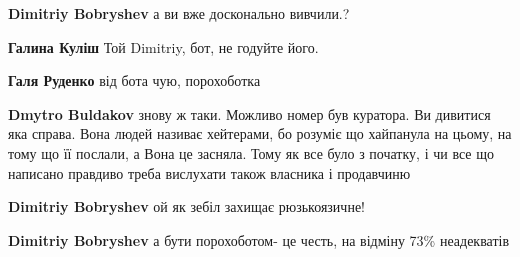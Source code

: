\begin{itemize}
\begin{itemize}
\textbf{Dimitriy Bobryshev} а ви вже досконально вивчили.?

 
\textbf{Галина Куліш}
Той Dimitriy,
бот, не годуйте його.

 
\textbf{Галя Руденко} від бота чую, порохоботка

 
\textbf{Dmytro Buldakov} знову ж таки. Можливо номер був куратора.
Ви дивитися яка справа. Вона людей називає хейтерами, бо розуміє що хайпанула на цьому, на тому що її послали, а Вона це засняла. Тому як все було з початку, і чи все що написано правдиво треба вислухати також власника і продавчиню

 
\textbf{Dimitriy Bobryshev} ой як зебіл захищає рюзькоязичне!

 
\textbf{Dimitriy Bobryshev} а бути порохоботом- це честь, на відміну 73\% неадекватів

 

\end{itemize}
\end{itemize}
